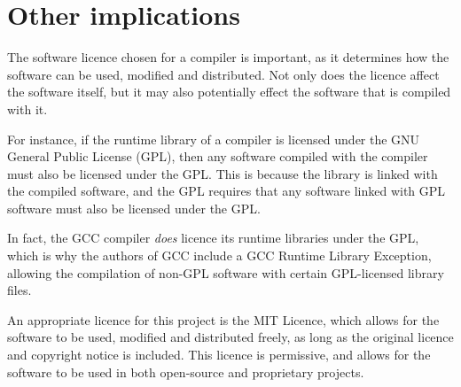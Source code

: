 \section{Other implications}

The software licence chosen for a compiler is important, as it determines how the software can be
used, modified and distributed. Not only does the licence affect the software itself, but it may
also potentially effect the software that is compiled with it.

For instance, if the runtime library of a compiler is licensed under the GNU General Public
License (GPL), then any software compiled with the compiler must also be licensed under the GPL.
This is because the library is linked with the compiled software, and the GPL requires that any
software linked with GPL software must also be licensed under the GPL.

In fact, the GCC compiler \emph{does} licence its runtime libraries under the GPL, which is why the
authors of GCC include a GCC Runtime Library Exception, allowing the compilation of non-GPL software
with certain GPL-licensed library files.~\autocite{gcc-exception}

An appropriate licence for this project is the MIT Licence, which allows for the software to be
used, modified and distributed freely, as long as the original licence and copyright notice is
included. This licence is permissive, and allows for the software to be used in both open-source and
proprietary projects.
